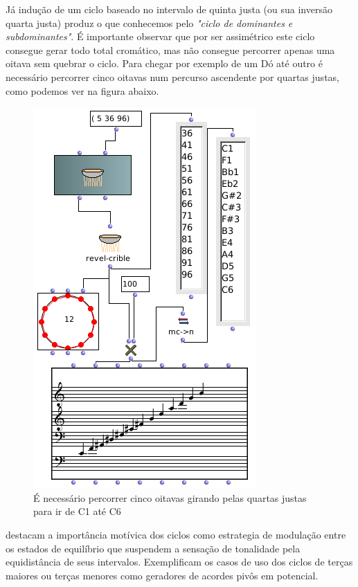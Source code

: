 \documentclass[
	12pt,				%
	openright,			%
	twoside,			%
	a4paper,			%
	english,			%
	french,				%
	spanish,			%
	brazil				%
	]{abntex2}
\begin{document}
Já indução de um ciclo baseado no intervalo de quinta justa (ou sua inversão quarta justa) produz o que conhecemos pelo \textit{"ciclo de dominantes e subdominantes"}. É importante observar que por ser assimétrico este ciclo consegue gerar todo total cromático, mas não consegue percorrer apenas uma oitava sem quebrar o ciclo. Para chegar por exemplo de um Dó até outro é necessário percorrer cinco oitavas num percurso ascendente por quartas justas, como podemos ver na figura abaixo.


\begin{figure}[!h]
	\caption{\label{fig_grafico}É necessário percorrer cinco oitavas girando pelas quartas justas para ir de C1 até C6  }
	\begin{center}
	    \includegraphics[scale=0.5]{ciclos/5JcrivosOM.png}
	\end{center}
\end{figure}

 destacam a importância motívica dos ciclos como estrategia de modulação entre os estados de equilíbrio que suspendem a sensação de tonalidade pela equidistância de seus intervalos. Exemplificam os casos de uso dos ciclos de terças maiores ou terças menores como geradores de acordes pivôs em potencial.
\end{document}
